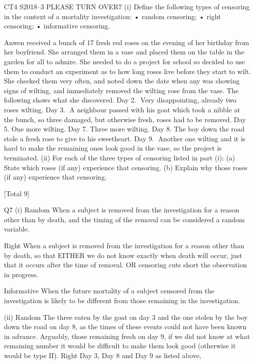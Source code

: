 CT4 S2018–3 
PLEASE TURN OVER7
(i)
Define the following types of censoring in the context of a mortality
investigation:
• random censoring;
• right censoring;
• informative censoring.

Anwen received a bunch of 17 fresh red roses on the evening of her birthday from her
boyfriend. She arranged them in a vase and placed them on the table in the garden
for all to admire. She needed to do a project for school so decided to use them to
conduct an experiment as to how long roses live before they start to wilt. She checked
them very often, and noted down the date when any was showing signs of wilting, and
immediately removed the wilting rose from the vase. The following shows what she
discovered.
Day 2.	Very disappointing, already two roses wilting.
Day 3.	A neighbour passed with his goat which took a nibble at the bunch, so three
damaged, but otherwise fresh, roses had to be removed.
Day 5. One more wilting.
Day 7. Three more wilting.
Day 8. The boy down the road stole a fresh rose to give to his sweetheart.
Day 9.	Another one wilting and it is hard to make the remaining ones look good in
the vase, so the project is terminated.
(ii)
For each of the three types of censoring listed in part (i):
(a)
State which roses (if any) experience that censoring.
(b)
Explain why those roses (if any) experience that censoring.


[Total 9]



Q7
(i)
Random
When a subject is removed from the investigation for
a reason other than by death, and the timing of the removal
can be considered a random variable.

Right
When a subject is removed from the investigation for a reason other
than by death, so that
EITHER
we do not know exactly when death will occur,
just that it occurs after the time of removal.
OR
censoring cuts short the observation in progress.

Informative
When the future mortality of a subject censored from the investigation is
likely to be different from those remaining in the investigation.


(ii)
Random
The three eaten by the goat on day 3 and the one stolen by the boy
down the road on day 8, 
as the times of these events could not have been known in advance. 
Arguably, those remaining fresh on day 9, if we did not know at
what remaining number it would be difficult to make them look good
(otherwise it would be type II). 
Right
Day 3, Day 8 and Day 9 as listed above,

